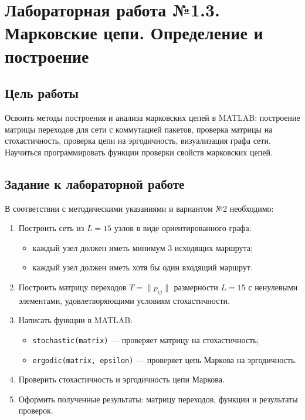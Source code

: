 \chapter{Лабораторная работа №1.3. Марковские цепи. Определение и построение}
\label{ch:chap3}

\section{Цель работы}
\label{sec:goal3}

    Освоить методы построения и анализа марковских цепей в MATLAB: построение матрицы переходов для сети с коммутацией пакетов, проверка матрицы на стохастичность, проверка цепи на эргодичность, визуализация графа сети. Научиться программировать функции проверки свойств марковских цепей.

\section{Задание к лабораторной работе}
\label{sec:task3}

    В соответствии с методическими указаниями \cite{andreev2024tmo} и вариантом №2 необходимо:

    \begin{enumerate}
        \item Построить сеть из $L = 15$ узлов в виде ориентированного графа:
        \begin{itemize}
            \item каждый узел должен иметь минимум 3 исходящих маршрута;
            \item каждый узел должен иметь хотя бы один входящий маршрут.
        \end{itemize}
        \item Построить матрицу переходов $T = \|p_{ij}\|$ размерности $L = 15$ с ненулевыми элементами, удовлетворяющими условиям стохастичности.
        \item Написать функции в MATLAB:
        \begin{itemize}
            \item \verb|stochastic(matrix)| — проверяет матрицу на стохастичность;
            \item \verb|ergodic(matrix, epsilon)| — проверяет цепь Маркова на эргодичность.
        \end{itemize}
        \item Проверить стохастичность и эргодичность цепи Маркова.
        \item Оформить полученные результаты: матрицу переходов, функции и результаты проверок.
    \end{enumerate}

